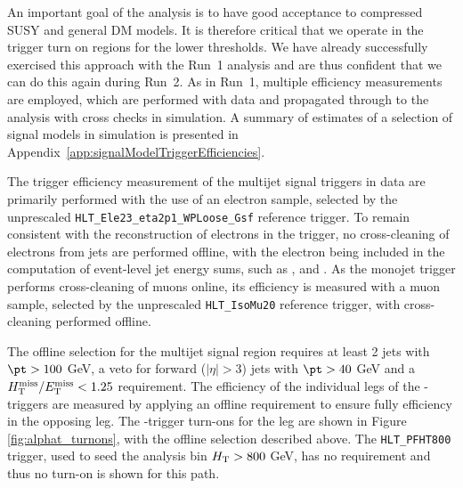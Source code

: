An important goal of the analysis is to have good acceptance
to compressed SUSY and general DM models. It is therefore critical
that we operate in the trigger turn on regions for the lower
thresholds. We have already successfully exercised this approach with
the Run~1 analysis and are thus confident that we can do this again
during Run~2. As in Run~1, multiple efficiency measurements are
employed, which are performed with data and propagated through to the
analysis with cross checks in simulation. A summary of estimates of a 
selection of signal models in simulation is presented in Appendix~\ref{app:signalModelTriggerEfficiencies}.



% 
The trigger efficiency measurement of the multijet signal triggers in data are primarily performed with the use of 
an electron sample, selected by the unprescaled \verb!HLT_Ele23_eta2p1_WPLoose_Gsf! reference trigger. 
To remain consistent with the reconstruction of electrons in the trigger, no cross-cleaning of electrons from jets 
are performed offline, with the electron being included in the computation of event-level jet energy sums, such as 
\scalht, \MHT and \alt. As the monojet trigger performs cross-cleaning of muons online, its efficiency is measured 
with a muon sample, selected by the unprescaled \verb!HLT_IsoMu20! reference trigger, with cross-cleaning performed offline.

The offline selection for the multijet signal region requires at least 2 jets with $\pt > 100$ GeV, a veto for forward ($|\eta|>3$) 
jets with $\pt > 40$ GeV 
and a $\mbox{$\mbox{$H_{\rm T}^{\rm miss}$} / \mbox{$E_\text{T}^{\rm miss}$}$} < 1.25$ requirement. The efficiency of the individual legs of the \scalht-\alphat triggers are measured 
by applying an offline requirement to ensure fully efficiency in the opposing leg. The \scalht-\alphat trigger turn-ons for the 
\alt leg are shown in Figure \ref{fig:alphat_turnons}, with the offline selection described above. The \verb!HLT_PFHT800! 
trigger, used to seed the analysis bin $\mbox{$H_\text{T}$} > 800$ GeV, 
has no \alt requirement and thus no \alt turn-on is shown for this path.

